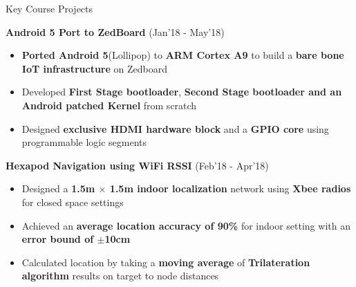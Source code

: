 \documentclass{resume}
\newcommand{\sepval}{-0.5em}
\begin{document}
\begin{rSection}{Key Course Projects}

\vspace{-.4cm}

\item {\bf Android 5 Port to ZedBoard} \hfill {(Jan'18 - May'18)}\\
[-0.4cm]

\begin{itemize}[leftmargin=*]

	\itemsep \sepval

	\item {\bf Ported Android 5}(Lollipop) to {\bf ARM Cortex A9} to build a {\bf bare bone IoT infrastructure} on Zedboard
	
	\item Developed {\bf First Stage bootloader}, {\bf Second Stage bootloader and an Android patched Kernel} from scratch
	
	\item Designed {\bf exclusive HDMI hardware block} and a {\bf GPIO core} using programmable logic segments
	
\end{itemize}

\vspace{-0.1cm}
\item {\bf Hexapod Navigation using WiFi RSSI}  \hfill{(Feb'18 - Apr'18)}\\
[-0.4cm]

\begin{itemize}[leftmargin=*]

	\itemsep \sepval

	\item Designed a {\bf 1.5m $\times$ 1.5m indoor localization} network using {\bf Xbee radios} for closed space settings
	     
	\item Achieved an {\bf average location accuracy of 90\%} for indoor setting with an {\bf error bound of $\pm$10cm}
	
	\item Calculated location by taking a {\bf moving average} of {\bf Trilateration algorithm} results on target to node distances



\end{itemize}
\end{rSection}
\end{document}
